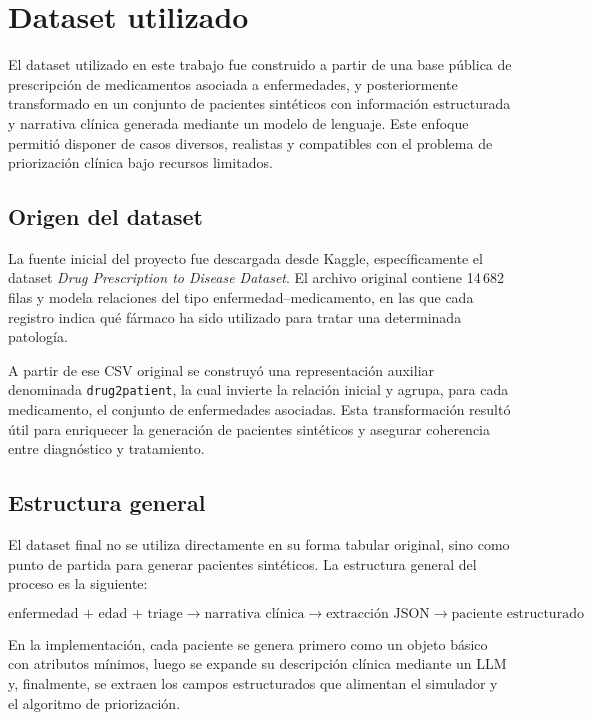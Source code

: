 \documentclass[12pt,a4paper]{article}
\begin{document}
\section{Dataset utilizado}

El dataset utilizado en este trabajo fue construido a partir de una base pública de prescripción de medicamentos 
asociada a enfermedades, y posteriormente transformado en un conjunto de pacientes sintéticos con información estructurada 
y narrativa clínica generada mediante un modelo de lenguaje. 
Este enfoque permitió disponer de casos diversos, realistas y compatibles con el problema de priorización clínica 
bajo recursos limitados.

\subsection{Origen del dataset}

La fuente inicial del proyecto fue descargada desde Kaggle, 
específicamente el dataset \emph{Drug Prescription to Disease Dataset}. 
El archivo original contiene 14\,682 filas y modela relaciones del tipo enfermedad--medicamento, 
en las que cada registro indica qué fármaco ha sido utilizado para tratar una determinada patología.

A partir de ese CSV original se construyó una representación auxiliar denominada \texttt{drug2patient}, 
la cual invierte la relación inicial y agrupa, para cada medicamento, el conjunto de enfermedades asociadas. 
Esta transformación resultó útil para enriquecer la generación de pacientes sintéticos y asegurar coherencia entre 
diagnóstico y tratamiento.

\subsection{Estructura general}

El dataset final no se utiliza directamente en su forma tabular original, 
sino como punto de partida para generar pacientes sintéticos. La estructura general del proceso es la siguiente:

\[
\text{enfermedad + edad + triage} \rightarrow \text{narrativa clínica} \rightarrow \text{extracción JSON} \rightarrow \text{paciente estructurado}
\]

En la implementación, cada paciente se genera primero como un objeto básico con atributos mínimos, 
luego se expande su descripción clínica mediante un LLM y, finalmente, 
se extraen los campos estructurados que alimentan el simulador y el algoritmo de priorización.
\end{document}
